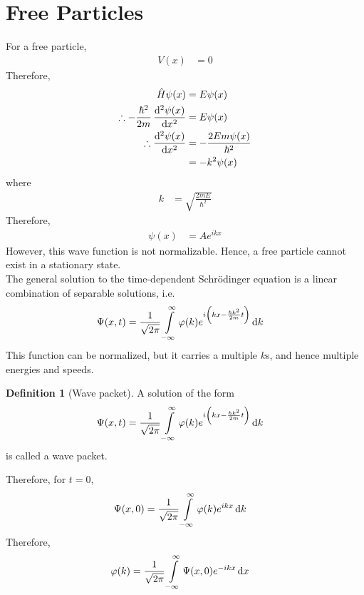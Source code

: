 \documentclass[titlepage, fleqn, a4paper, 12pt, twoside]{article}
\theoremstyle{definition}
\newtheorem{definition}{Definition}
\theoremstyle{theorem}
\begin{document}

\section{Free Particles}

For a free particle,
\begin{align*}
	V(x) &= 0
\end{align*}
Therefore,
\begin{align*}
	\hat{H} \psi(x) &= E \psi(x)\\
	\therefore -\frac{\hbar^2}{2 m} \dod[2]{\psi(x)}{x} &= E \psi(x)\\
	\therefore \dod[2]{\psi(x)}{x} &= -\frac{2 E m \psi(x)}{\hbar^2}\\
	&= -k^2 \psi(x)
\end{align*}
where
\begin{align*}
	k &= \sqrt{\frac{2 m E}{\hbar^2}}
\end{align*}
Therefore,
\begin{align*}
	\psi(x) &= A e^{i k x}
\end{align*}
However, this wave function is not normalizable.
Hence, a free particle cannot exist in a stationary state.\\

The general solution to the time-dependent Schrödinger equation is a linear combination of separable solutions, i.e.
\begin{align*}
	\Psi(x,t) &= \frac{1}{\sqrt{2 \pi}} \int\limits_{-\infty}^{\infty} \varphi(k) e^{i \left( k x - \frac{\hbar k^2}{2 m} t \right)} \dif k
\end{align*}
This function can be normalized, but it carries a multiple $k$s, and hence multiple energies and speeds.

\begin{definition}[Wave packet]
	A solution of the form
	\begin{align*}
		\Psi(x,t) &= \frac{1}{\sqrt{2 \pi}} \int\limits_{-\infty}^{\infty} \varphi(k) e^{i \left( k x - \frac{\hbar k^2}{2 m} t \right)} \dif k
	\end{align*}
	is called a wave packet.
\end{definition}

Therefore, for $t = 0$,
\begin{align*}
	\Psi(x,0) &= \frac{1}{\sqrt{2 \pi}} \int\limits_{-\infty}^{\infty} \varphi(k) e^{i k x} \dif k
\end{align*}
Therefore,
\begin{align*}
	\varphi(k) &= \frac{1}{\sqrt{2 \pi}} \int\limits_{-\infty}^{\infty} \Psi(x,0) e^{-i k x} \dif x
\end{align*}
\end{document}

